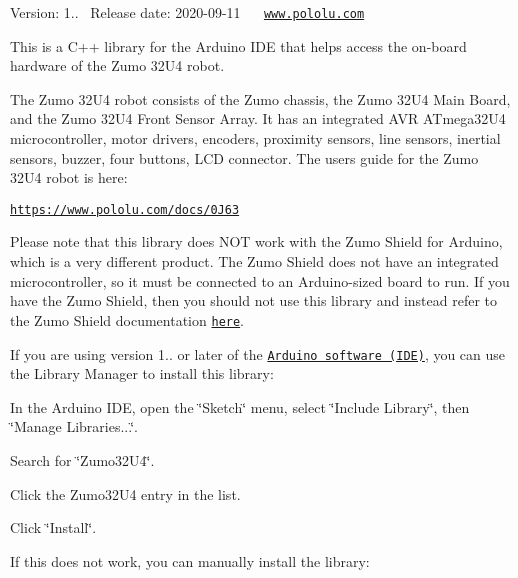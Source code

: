 Version\+: 1..~\newline
 Release date\+: 2020-\/09-\/11~\newline
 \href{https://travis-ci.org/pololu/zumo-32u4-arduino-library}{\tt }~\newline
 \href{http://www.pololu.com/}{\tt www.\+pololu.\+com}

This is a C++ library for the Arduino I\+DE that helps access the on-\/board hardware of the Zumo 32\+U4 robot.

The Zumo 32\+U4 robot consists of the Zumo chassis, the Zumo 32\+U4 Main Board, and the Zumo 32\+U4 Front Sensor Array. It has an integrated A\+VR A\+Tmega32\+U4 microcontroller, motor drivers, encoders, proximity sensors, line sensors, inertial sensors, buzzer, four buttons, L\+CD connector. The user\textquotesingle{}s guide for the Zumo 32\+U4 robot is here\+:

\href{https://www.pololu.com/docs/0J63}{\tt https\+://www.\+pololu.\+com/docs/0\+J63}

Please note that this library does N\+OT work with the Zumo Shield for Arduino, which is a very different product. The Zumo Shield does not have an integrated microcontroller, so it must be connected to an Arduino-\/sized board to run. If you have the Zumo Shield, then you should not use this library and instead refer to the Zumo Shield documentation \href{https://www.pololu.com/docs/0J57}{\tt here}.

If you are using version 1.. or later of the \href{http://www.arduino.cc/en/Main/Software}{\tt Arduino software (I\+DE)}, you can use the Library Manager to install this library\+:


\begin{DoxyEnumerate}
\item In the Arduino I\+DE, open the \char`\"{}\+Sketch\char`\"{} menu, select \char`\"{}\+Include Library\char`\"{}, then \char`\"{}\+Manage Libraries...\char`\"{}.
\item Search for \char`\"{}\+Zumo32\+U4\char`\"{}.
\item Click the Zumo32\+U4 entry in the list.
\item Click \char`\"{}\+Install\char`\"{}.
\end{DoxyEnumerate}

If this does not work, you can manually install the library\+:


